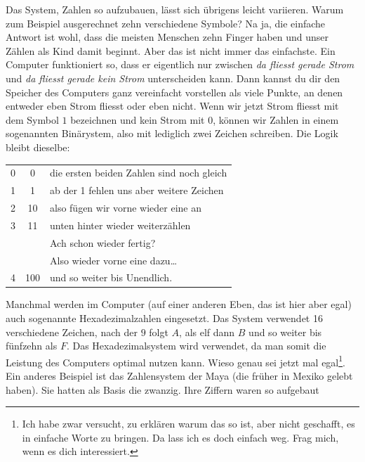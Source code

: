 Das System, Zahlen so aufzubauen, lässt sich übrigens leicht variieren. Warum zum Beispiel ausgerechnet zehn verschiedene Symbole? Na ja, die einfache Antwort ist wohl, dass die meisten Menschen zehn Finger haben und unser Zählen als Kind damit beginnt. Aber das ist nicht immer das einfachste. Ein Computer funktioniert so, dass er eigentlich nur zwischen \textit{da fliesst gerade Strom} und \textit{da fliesst gerade kein Strom} unterscheiden kann. Dann kannst du dir den Speicher des Computers ganz vereinfacht vorstellen als viele Punkte, an denen entweder eben Strom fliesst oder eben nicht. Wenn wir jetzt Strom fliesst mit dem Symbol $1$ bezeichnen und kein Strom mit $0$, können wir Zahlen in einem sogenannten Binärystem, also mit lediglich zwei Zeichen schreiben. Die Logik bleibt dieselbe:

\begin{small}
\begin{center}
\begin{tabular}{ c c l }
0 & 0 & die ersten beiden Zahlen sind noch gleich\\
1 & 1 & ab der 1 fehlen uns aber weitere Zeichen \\
2 & 10 & also fügen wir vorne wieder eine an \\
3 & 11 & unten hinter wieder weiterzählen\\
& & Ach schon wieder fertig?\\
&& Also wieder vorne eine dazu\dots \\
4 & 100 & und so weiter bis Unendlich.
\end{tabular}
\end{center}
\end{small}
Manchmal werden im Computer (auf einer anderen Eben, das ist hier aber egal) auch sogenannte Hexadezimalzahlen eingesetzt. Das System verwendet 16 verschiedene Zeichen, nach der $9$ folgt $A$, als elf dann $B$ und so weiter bis fünfzehn als $F$. Das Hexadezimalsystem wird verwendet, da man somit die Leistung des Computers optimal nutzen kann. Wieso genau sei jetzt mal egal\footnote{Ich habe zwar versucht, zu erklären warum das so ist, aber nicht geschafft, es in einfache Worte zu bringen. Da lass ich es doch einfach weg. Frag mich, wenn es dich interessiert.}. Ein anderes Beispiel ist das Zahlensystem der Maya (die früher in Mexiko gelebt haben). Sie hatten als Basis die zwanzig. Ihre Ziffern waren so aufgebaut

